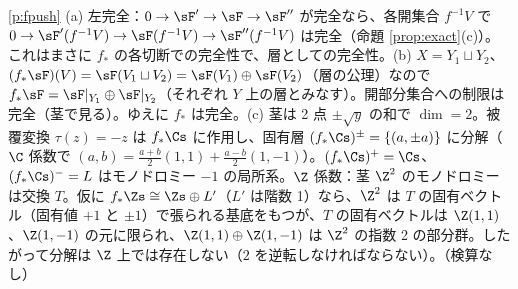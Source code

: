 \begin{sol}{\ref{p:fpush}}
(a) 左完全：$0\to\sF'\to\sF\to\sF''$ が完全なら、各開集合 $f^{-1}V$ で $0\to\sF'(f^{-1}V)\to\sF(f^{-1}V)\to\sF''(f^{-1}V)$ は完全（命題 \ref{prop:exact}(c)）。これはまさに $f_*$ の各切断での完全性で、層としての完全性。(b) $X=Y_1\sqcup Y_2$、$(f_*\sF)(V)=\sF(V_1\sqcup V_2)=\sF(V_1)\oplus\sF(V_2)$（層の公理）なので $f_*\sF=\sF|_{Y_1}\oplus\sF|_{Y_2}$（それぞれ $Y$ 上の層とみなす）。開部分集合への制限は完全（茎で見る）。ゆえに $f_*$ は完全。(c) 茎は 2 点 $\pm\sqrt y$ の和で $\dim=2$。被覆変換 $\tau(z)=-z$ は $f_*\Cs$ に作用し、固有層 $(f_*\Cs)^{\pm}=\{(a,\pm a)\}$ に分解（$\C$ 係数で $(a,b)=\frac{a+b}2(1,1)+\frac{a-b}2(1,-1)$）。$(f_*\Cs)^+=\Cs$、$(f_*\Cs)^-=L$ はモノドロミー $-1$ の局所系。$\Z$ 係数：茎 $\Z^2$ のモノドロミーは交換 $T$。仮に $f_*\Zs\cong\Zs\oplus L'$（$L'$ は階数 1）なら、$\Z^2$ は $T$ の固有ベクトル（固有値 $+1$ と $\pm1$）で張られる基底をもつが、$T$ の固有ベクトルは $\Z(1,1)$、$\Z(1,-1)$ の元に限られ、$\Z(1,1)\oplus\Z(1,-1)$ は $\Z^2$ の指数 2 の部分群。したがって分解は $\Z$ 上では存在しない（$2$ を逆転しなければならない）。（検算なし）
\end{sol}

